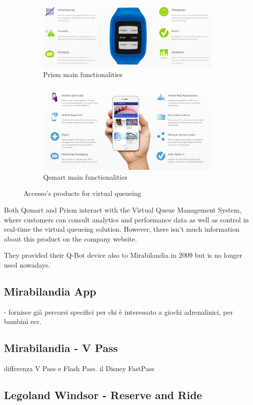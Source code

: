 \begin{figure}[H]
    \centering
    \begin{subfigure}[b]{0.85\textwidth}
        \centering
        \includegraphics[width=\textwidth]{img/prism}
        \caption{Prism main functionalities}
        \label{fig:prism}
    \end{subfigure}
    \hfill
    \begin{subfigure}[b]{0.85\textwidth}
        \centering
        \includegraphics[width=\textwidth]{img/qsmart}
        \caption{Qsmart main functionalities}
        \label{fig:qsmart}
    \end{subfigure}
    \caption{Accesso's products for virtual queueing\footnotemark}
    \label{fig:prismart}
\end{figure}

Both Qsmart and Prism interact with the Virtual Queue Management System, where customers can consult
analytics and performance data as well as control in real-time the virtual queueing solution.
However, there isn't much information about this product on the company website.

They provided their Q-Bot device also to Mirabilandia in 2009 but is no longer used nowadays.


\subsection{Mirabilandia App}\label{subsec:mirabilandia-app}
- fornisce già percorsi specifici per chi è interessato a giochi adrenalinici, per bambini ecc.

\subsection{Mirabilandia - V Pass}\label{subsec:mirabilandia-v-pass}
differenza V Pass e Flash Pass.
il Disney FastPass

\subsection{Legoland Windsor - Reserve and Ride}\label{subsec:legoland-windsor---reserve-and-ride}
